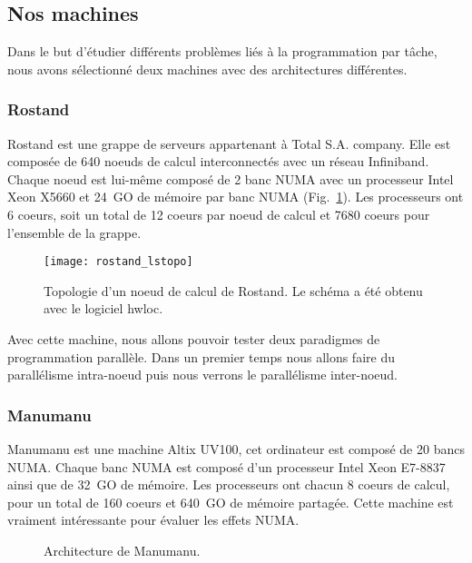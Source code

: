 \subsection{Nos machines}
Dans le but d'étudier différents problèmes liés à la programmation par tâche, nous avons sélectionné deux machines avec des architectures différentes.

\subsubsection{Rostand}
Rostand est une grappe de serveurs appartenant à Total S.A. company.
%
Elle est composée de 640 noeuds de calcul interconnectés avec un réseau Infiniband.
%
Chaque noeud est lui-même composé de 2 banc NUMA avec un processeur Intel Xeon X5660 et 24~GO de mémoire par banc NUMA (Fig.~\ref{fig:rostand}).
%
Les processeurs ont 6 coeurs, soit un total de 12 coeurs par noeud de calcul et 7680 coeurs pour l'ensemble de la grappe.

\begin{figure}[!ht]
        \centering
        \texttt{[image: rostand\_lstopo]}
        \caption{Topologie d'un noeud de calcul de Rostand. Le schéma a été obtenu avec le logiciel hwloc.}
        \label{fig:rostand}
\end{figure}

Avec cette machine, nous allons pouvoir tester deux paradigmes de programmation parallèle.
%
Dans un premier temps nous allons faire du parallélisme intra-noeud puis nous verrons le parallélisme inter-noeud.

\subsubsection{Manumanu}
Manumanu est une machine Altix UV100, cet ordinateur est composé de 20 bancs NUMA.
%
Chaque banc NUMA est composé d'un processeur Intel Xeon E7-8837 ainsi que de 32~GO de mémoire.
%
Les processeurs ont chacun 8 coeurs de calcul, pour un total de 160 coeurs et 640~GO de mémoire partagée.
%
Cette machine est vraiment intéressante pour évaluer les effets NUMA.

\begin{figure}[!ht]
     \begin{center}
    \end{center}
    \caption{Architecture de Manumanu.}
    \label{fig:manumanu}
\end{figure}

